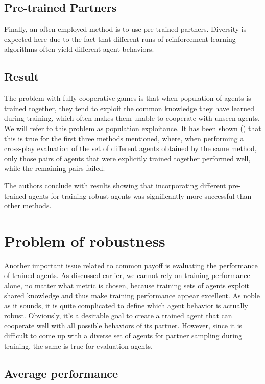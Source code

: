 \subsection{Pre-trained Partners}
Finally, an often employed method is to use pre-trained partners.
Diversity is expected here due to the fact that different runs of reinforcement learning algorithms often yield different agent behaviors.


\subsection{Result}\label{offDiagonalReport}
The problem with fully cooperative games is that when population of agents is trained together, they tend to exploit the common knowledge they have learned during training, which often makes them unable to cooperate with unseen agents.
We will refer to this problem as population exploitance\label{PopulationExploitance}. 
It has been shown (\cite{10.1007/978-3-030-63823-8_46}) that this is true for the first three methods mentioned, 
where, when performing a cross-play evaluation of the set of different agents obtained by the same method, 
only those pairs of agents that were explicitly trained together performed well, while the remaining pairs failed.

The authors conclude with results showing that incorporating different pre-trained agents for training robust agents was significantly more successful than other methods.


\section{Problem of robustness}\label{RobustnessEvaluation}
Another important issue related to common payoff is evaluating the performance of trained agents.
As discussed earlier, we cannot rely on training performance alone, no matter what metric is chosen, because training sets of agents exploit shared knowledge and thus make training performance appear excellent.
As noble as it sounds, it is quite complicated to define which agent behavior is actually robust.
Obviously, it's a desirable goal to create a trained agent that can cooperate well with all possible behaviors of its partner.
However, since it is difficult to come up with a diverse set of agents for partner sampling during training, the same is true for evaluation agents.

\subsection{Average performance}

